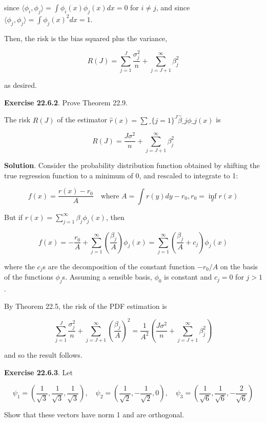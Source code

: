 since
\(\langle \phi_{i}, \phi_{j} \rangle = \int \phi_{i}(x) \phi_{j}(x) dx = 0\) for
\(i \neq j\), and since
\(\langle \phi_{j}, \phi_{j} \rangle = \int \phi_{j}(x)^{2} dx = 1\).

Then, the risk is the bias squared plus the variance,

\[ R(J) = \sum_{j=1}^J \frac{\sigma_{j}^{2}}{n} + \sum_{j=J+1}^{\infty} \beta_{j}^{2}\]

as desired.

\textbf{Exercise 22.6.2}. Prove Theorem 22.9.

The risk \(R(J)\) of the estimator $ \hat{r}(x) = \sum\_\{j=1\}^{J}
\hat{\beta}\_{j} \phi\_{j}(x) $ is

\[ R(J) = \frac{J \sigma^{2}}{n} + \sum_{j=J+1}^{\infty} \beta_{j}^{2} \]

\textbf{Solution}. Consider the probability distribution function
obtained by shifting the true regression function to a minimum of 0, and
rescaled to integrate to 1:

\[ f(x) = \frac{r(x) - r_{0}}{A} \quad \text{where } A = \int r(y) dy - r_{0}, r_{0} = \inf_x r(x) \]

But if \(r(x) = \sum_{j=1}^{\infty} \beta_{j} \phi_{j}(x)\), then

\[ f(x) = -\frac{r_{0}}{A} + \sum_{j=1}^{\infty} \left( \frac{\beta_{j}}{A} \right) \phi_{j}(x) = \sum_{j=1}^{\infty} \left( \frac{\beta_{j}}{A} + c_{j} \right) \phi_{j}(x) \]

where the \(c_{j}\)s are the decomposition of the constant function
\(-r_{0} / A\) on the basis of the functions \(\phi_{j}\)s. Assuming a
sensible basis, \(\phi_{0}\) is constant and \(c_{j} = 0\) for \(j > 1\).

By Theorem 22.5, the risk of the PDF estimation is

\[ \sum_{j=1}^J \frac{\sigma_{j}^{2}}{n} + \sum_{j=J+1}^{\infty} \left( \frac{\beta_{j}}{A} \right)^{2} = \frac{1}{A^{2}} \left( \frac{J \sigma^{2}}{n} + \sum_{j=J+1}^{\infty} \beta_{j}^{2} \right)\]

and so the result follows.

\textbf{Exercise 22.6.3}. Let

\[ \psi_{1} = \left( \frac{1}{\sqrt{3}}, \frac{1}{\sqrt{3}} , \frac{1}{\sqrt{3}} \right),
\quad
\psi_{2} = \left( \frac{1}{\sqrt{2}}, -\frac{1}{\sqrt{2}} , 0 \right),
\quad
\psi_{3} = \left( \frac{1}{\sqrt{6}}, \frac{1}{\sqrt{6}} , -\frac{2}{\sqrt{6}} \right)
\]

Show that these vectors have norm 1 and are orthogonal.

